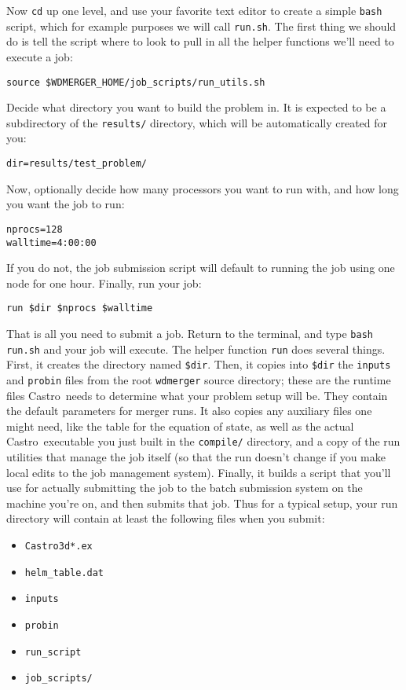 \documentclass[12pt]{book}
\newcommand{\castro}{{\sf Castro}}
\begin{document}
Now \texttt{cd} up one level, and use your favorite text editor to create a simple 
\texttt{bash} script, which for example purposes we will call \texttt{run.sh}.
The first thing we should do is tell the script where to look to pull in 
all the helper functions we'll need to execute a job:

\begin{lstlisting}
source $WDMERGER_HOME/job_scripts/run_utils.sh
\end{lstlisting}%

Decide what directory you want to build the problem in. It is expected 
to be a subdirectory of the \texttt{results/} directory, which will be
automatically created for you:
\begin{lstlisting}
dir=results/test_problem/
\end{lstlisting}
Now, optionally decide how many processors you want to run with, and 
how long you want the job to run:
\begin{lstlisting}
nprocs=128
walltime=4:00:00
\end{lstlisting}
If you do not, the job submission script will default to running the job
using one node for one hour. Finally, run your job:
\begin{lstlisting}
run $dir $nprocs $walltime
\end{lstlisting}%
That is all you need to submit a job. Return to the terminal, and type \texttt{bash run.sh}
and your job will execute. The helper function \texttt{run} does several things. First, 
it creates the directory named \texttt{\$dir}. Then, it copies into \texttt{\$dir} the \texttt{inputs}
and \texttt{probin} files from the root \texttt{wdmerger} source directory; these are the runtime
files \castro\ needs to determine what your problem setup will be. They contain the default 
parameters for merger runs. It also copies any auxiliary files one might need, like the 
table for the equation of state, as well as the actual \castro\ executable you just built in the 
\texttt{compile/} directory, and a copy of the run utilities that manage the job itself (so that the 
run doesn't change if you make local edits to the job management system). Finally, it builds a script 
that you'll use for actually submitting the job to the batch submission system on the machine you're on, 
and then submits that job. Thus for a typical setup, your run directory will contain at least the following 
files when you submit:
\begin{itemize}
  \item \texttt{Castro3d*.ex}
  \item \texttt{helm\_table.dat}
  \item \texttt{inputs}
  \item \texttt{probin}
  \item \texttt{run\_script}
  \item \texttt{job\_scripts/}
\end{itemize}
\end{document}
